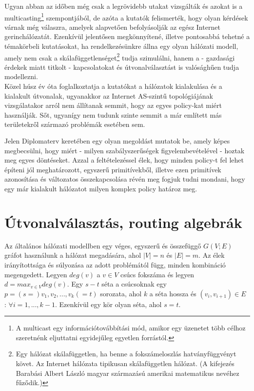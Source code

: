   Ugyan abban az időben még csak a legrövidebb utakat vizsgálták és azokat is a multicasting\footnote{A multicast egy információtovábbítási mód, amikor egy üzenetet több célhoz szeretnénk eljuttatni egyidejűleg egyetlen forrástól.} szempontjából, de azóta a kutatók felismerték, hogy olyan kérdések várnak még válaszra, amelyek alapvetően befolyásolják az egész Internet gerinchálózatát. Ezenkívül jelentősen megkönnyítené, illetve pontosabbá tehetné a témakörbeli kutatásokat, ha rendelkezésünkre állna egy olyan hálózati modell, amely nem csak a skálafüggetlenséget\footnote{Egy hálózat skálafüggetlen, ha benne a fokszámeloszlás hatványfüggvényt követ. Az Internet hálózata tipikusan skálafüggetlen hálózat. (A kifejezés Barabási Albert László magyar származású amerikai matematikus nevéhez fűződik.)} tudja szimulálni, hanem a - gazdasági érdekek miatt titkolt - kapcsolatokat és útvonalválasztást is valósághűen tudja modellezni.\\

  Közel húsz év óta foglalkoztatja a kutatókat a hálózatok kialakulása és a kialakult útvonalak, ugyanakkor az Internet AS-szintű topológiájának vizsgálatakor arról nem állítanak semmit, hogy az egyes policy-kat miért használják. Sőt, ugyanígy nem tudunk szinte semmit a már említett más területekről származó problémák esetében sem.

  Jelen Diplomaterv keretében egy olyan megoldást mutatok be, amely képes megbecsülni, hogy miért - milyen szabályszerűségek figyelembevételével - hoztak meg egyes döntéseket. Azzal a feltételezéssel élek, hogy minden policy-t fel lehet építeni jól meghatározott, egyszerű primitívekből, illetve ezen primitívek azonosítása és változatos összekapcsolása révén meg fogjuk tudni mondani, hogy egy már kialakult hálózatot milyen komplex policy határoz meg.\\

  \section{Útvonalválasztás, routing algebrák}\label{sect:section_routingalgebrak}

  Az általános hálózati modellben egy véges, egyszerű és összefüggő $G(V;E)$ gráfot használunk a hálózat megadására, ahol $|V| = n$ és $|E| = m$. Az élek irányítottsága és súlyozása az adott problémától függ, minden kombináció megengedett. Legyen $deg(v)$ a $v \in V$ csúcs fokszáma és legyen $d = max_{v \in V} deg(v)$. Egy $s-t$ séta a csúcsoknak egy $p = (s =)v_1, v_2, ..., v_k(= t)$ sorozata, ahol $k$ a séta hossza és $(v_i, v_{i+1}) \in E$ : $\forall i = 1,...,k-1$. Ezenkívül egy kör olyan séta, ahol $s = t$.

